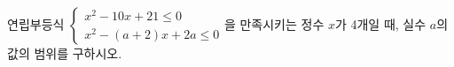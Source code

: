 연립부등식 $\begin{cases} x^2-10x+21\le 0 \\ x^2-(a+2)x+2a\le 0 \end{cases}$을 만족시키는 정수 $x$가 4개일 때, 실수 $a$의 값의 범위를 구하시오.
